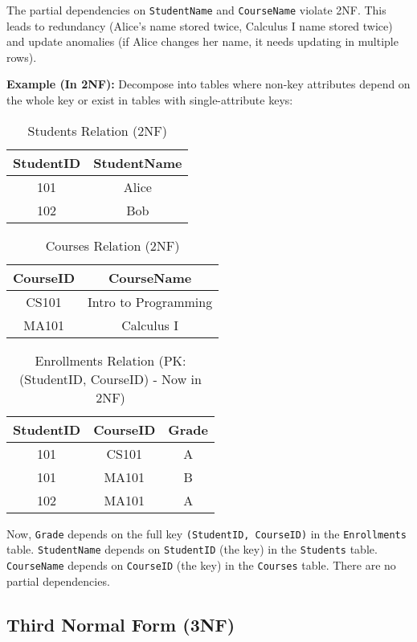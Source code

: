 \documentclass[12pt]{book}
\begin{document}
The partial dependencies on \texttt{StudentName} and \texttt{CourseName} violate 2NF. This leads to redundancy (Alice's name stored twice, Calculus I name stored twice) and update anomalies (if Alice changes her name, it needs updating in multiple rows).

\textbf{Example (In 2NF):}
Decompose into tables where non-key attributes depend on the whole key or exist in tables with single-attribute keys:

\begin{table}[htbp]
\centering
\begin{tabular}{@{}cc@{}}
\toprule
StudentID & StudentName \\
\midrule
101 & Alice \\
102 & Bob \\
\bottomrule
\end{tabular}
\caption{Students Relation (2NF)}
\label{tab:students_2nf}
\end{table}

\begin{table}[htbp]
\centering
\begin{tabular}{@{}cc@{}}
\toprule
CourseID & CourseName \\
\midrule
CS101 & Intro to Programming \\
MA101 & Calculus I \\
\bottomrule
\end{tabular}
\caption{Courses Relation (2NF)}
\label{tab:courses_2nf}
\end{table}

\begin{table}[htbp]
\centering
\begin{tabular}{@{}ccc@{}}
\toprule
StudentID & CourseID & Grade \\
\midrule
101 & CS101 & A \\
101 & MA101 & B \\
102 & MA101 & A \\
\bottomrule
\end{tabular}
\caption{Enrollments Relation (PK: (StudentID, CourseID) - Now in 2NF)}
\label{tab:enrollments_2nf}
\end{table}
Now, \texttt{Grade} depends on the full key \texttt{(StudentID, CourseID)} in the \texttt{Enrollments} table. \texttt{StudentName} depends on \texttt{StudentID} (the key) in the \texttt{Students} table. \texttt{CourseName} depends on \texttt{CourseID} (the key) in the \texttt{Courses} table. There are no partial dependencies.

\subsection{Third Normal Form (3NF)}
\end{document}
